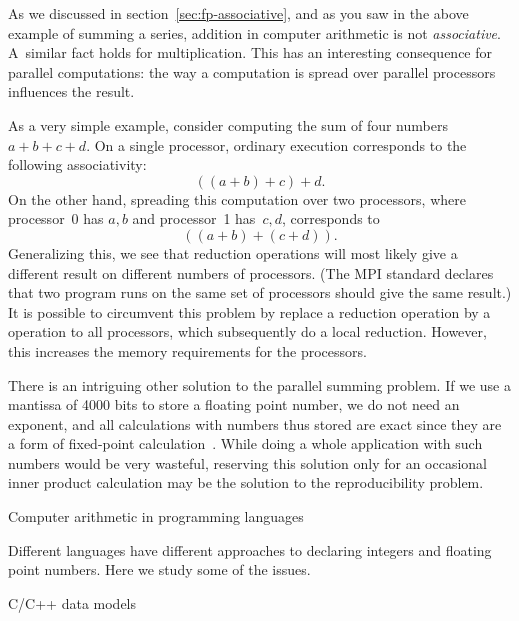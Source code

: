 As we discussed in section~\ref{sec:fp-associative}, and as you saw
in the above example of summing a series, addition in
computer arithmetic is not
\emph{associative}.
A~similar fact holds for
multiplication.  This has an interesting consequence for parallel
computations: the way a computation is spread over parallel processors
influences the result. 

As a very simple example, consider computing the sum of four numbers $a+b+c+d$.
On a single processor, ordinary execution corresponds to the following associativity:
\begin{equation}
  ((a+b)+c)+d.
\end{equation}
On the other hand, spreading this computation over two processors, 
where processor~0 has $a,b$ and processor~1 has~$c,d$,
corresponds to
\begin{equation}
  ((a+b)+(c+d)).
\end{equation}
Generalizing this, we see that reduction operations will most likely
give a different result on different numbers of processors. (The MPI
standard declares that two program runs on the same set of processors
should give the same result.)
It is possible to circumvent this problem by replace a reduction operation
by a  operation to all processors, which subsequently 
do a local reduction. However, this increases the memory requirements for the 
processors.

There is an intriguing other solution to the parallel summing problem.
If we use a mantissa of 4000 bits to store a floating point number, we
do not need an exponent, and all calculations with numbers thus stored
are exact since they are a form of fixed-point
calculation~\cite{Kulisch:2011:VFE,Kulish:dotproduct}.  While doing a
whole application with such numbers would be very wasteful, reserving
this solution only for an occasional inner product calculation may be
the solution to the reproducibility problem.


 {Computer arithmetic in programming languages}

Different languages have different approaches to declaring integers and
floating point numbers. Here we study some of the issues.

 {C/C++ data models}
\label{sec:data-model}

